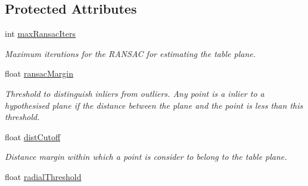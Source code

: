 \subsection*{Protected Attributes}
\begin{DoxyCompactItemize}
\item 
\hypertarget{classpersonal_robotics_1_1_object_segmentor_a9289ca41342c0d668e607aedf5e942a9}{}int \hyperlink{classpersonal_robotics_1_1_object_segmentor_a9289ca41342c0d668e607aedf5e942a9}{max\+Ransac\+Iters}\label{classpersonal_robotics_1_1_object_segmentor_a9289ca41342c0d668e607aedf5e942a9}

\begin{DoxyCompactList}\small\item\em Maximum iterations for the R\+A\+N\+S\+A\+C for estimating the table plane. \end{DoxyCompactList}\item 
\hypertarget{classpersonal_robotics_1_1_object_segmentor_ad9c9d0decbab77de45de076291a07c6a}{}float \hyperlink{classpersonal_robotics_1_1_object_segmentor_ad9c9d0decbab77de45de076291a07c6a}{ransac\+Margin}\label{classpersonal_robotics_1_1_object_segmentor_ad9c9d0decbab77de45de076291a07c6a}

\begin{DoxyCompactList}\small\item\em Threshold to distinguish inliers from outliers. Any point is a inlier to a hypothesised plane if the distance between the plane and the point is less than this threshold. \end{DoxyCompactList}\item 
\hypertarget{classpersonal_robotics_1_1_object_segmentor_aebc9c344c5001ab22746b2071783fc2a}{}float \hyperlink{classpersonal_robotics_1_1_object_segmentor_aebc9c344c5001ab22746b2071783fc2a}{dist\+Cutoff}\label{classpersonal_robotics_1_1_object_segmentor_aebc9c344c5001ab22746b2071783fc2a}

\begin{DoxyCompactList}\small\item\em Distance margin within which a point is consider to belong to the table plane. \end{DoxyCompactList}\item 
\hypertarget{classpersonal_robotics_1_1_object_segmentor_aa1f6238eb8f7bc42384f3b2016a13416}{}float \hyperlink{classpersonal_robotics_1_1_object_segmentor_aa1f6238eb8f7bc42384f3b2016a13416}{radial\+Threshold}\label{classpersonal_robotics_1_1_object_segmentor_aa1f6238eb8f7bc42384f3b2016a13416}


\end{DoxyCompactItemize}
